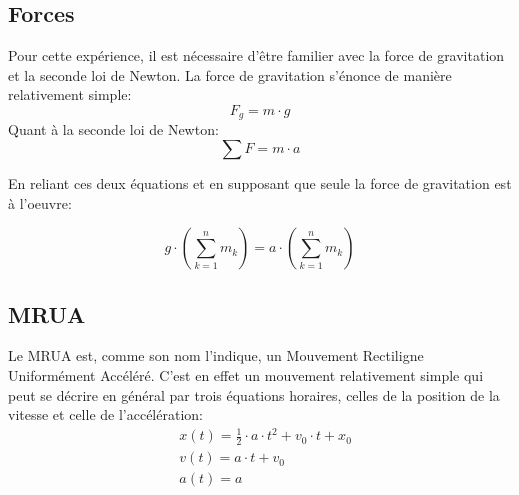 \subsection{Forces}
Pour cette expérience, il est nécessaire d'être familier avec la force de gravitation et la seconde loi de Newton.
La force de gravitation s'énonce de manière relativement simple:
\begin{equation}
    F_g = m \cdot g
\end{equation}
Quant à la seconde loi de Newton:
\begin{equation}
    \sum F = m \cdot a
\end{equation}

En reliant ces deux équations et en supposant que seule la force de gravitation est à l'oeuvre:

\begin{equation}
    g \cdot (\sum^{n}_{k=1}m_k) = a \cdot (\sum^{n}_{k=1}m_k)
\end{equation}

\subsection{MRUA}
Le MRUA est, comme son nom l'indique, un Mouvement Rectiligne Uniformément Accéléré. C'est en effet un mouvement relativement simple qui peut se décrire en général par trois équations horaires, celles de la position de la vitesse et celle de l'accélération:
\begin{align}
    & x(t) = \frac{1}{2} \cdot a\cdot t^2 + v_0 \cdot t + x_0 \\
    & v(t) = a \cdot t + v_0 \\
    & a(t) = a
\end{align}

